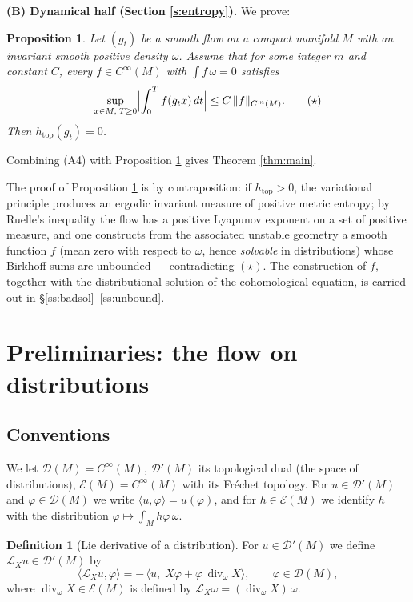 \documentclass[11pt]{amsart}
\theoremstyle{plain}
\newtheorem{proposition}[theorem]{Proposition}
\theoremstyle{definition}
\newtheorem{definition}[theorem]{Definition}
\theoremstyle{remark}
\newcommand{\D}{\mathcal{D}}
\newcommand{\DD}{\mathcal{D}'}
\newcommand{\EE}{\mathcal{E}}
\newcommand{\flow}{g_t}
\newcommand{\Lie}{\mathcal{L}}
\begin{document}
\medskip
\noindent\textbf{(B) Dynamical half (Section \ref{s:entropy}).}  We
prove:

\begin{proposition}\label{p:entropycore}
Let $(\flow)$ be a smooth flow on a compact manifold $M$ with an
invariant smooth positive density $\omega$.  Assume that for some
integer $m$ and constant $C$, every $f\in C^\infty(M)$ with
$\int f\,\omega=0$ satisfies
\[
\sup_{x\in M,\; T\ge 0}\Bigl|\int_0^{T}f(g_t x)\,dt\Bigr|
\le C\,\|f\|_{C^{m}(M)} .
\tag{$\star$}
\]
Then $h_{\mathrm{top}}(\flow)=0$.
\end{proposition}

Combining (A4) with Proposition \ref{p:entropycore} gives
Theorem \ref{thm:main}.

The proof of Proposition \ref{p:entropycore} is by contraposition:
if $h_{\mathrm{top}}>0$, the variational principle produces an
ergodic invariant measure of positive metric entropy; by Ruelle's
inequality the flow has a positive Lyapunov exponent on a set of
positive measure, and one constructs from the associated unstable
geometry a smooth function $f$ (mean zero with respect to $\omega$,
hence \emph{solvable} in distributions) whose Birkhoff sums are
unbounded --- contradicting $(\star)$.  The construction of $f$,
together with the distributional solution of the cohomological
equation, is carried out in \S\ref{ss:badsol}--\ref{ss:unbound}.

\section{Preliminaries: the flow on distributions}\label{s:prelim}

\subsection{Conventions}

We let $\D(M)=C^\infty(M)$, $\DD(M)$ its topological dual (the space
of distributions), $\EE(M)=C^\infty(M)$ with its Fr\'echet topology.
For $u\in \DD(M)$ and $\varphi\in \D(M)$ we write
$\langle u,\varphi\rangle=u(\varphi)$, and for $h\in \EE(M)$ we
identify $h$ with the distribution
$\varphi\mapsto\int_M h\varphi\,\omega$.

\begin{definition}[Lie derivative of a distribution]\label{d:Lie}
For $u\in\DD(M)$ we define $\Lie_X u\in\DD(M)$ by
\begin{equation}\label{eq:defLie}
\langle \Lie_X u,\varphi\rangle
= -\,\bigl\langle u,\;X\varphi+\varphi\,\operatorname{div}_\omega X\bigr\rangle,
\qquad \varphi\in\D(M),
\end{equation}
where $\operatorname{div}_\omega X\in\EE(M)$ is defined by
$\Lie_X\omega=(\operatorname{div}_\omega X)\,\omega$.
\end{definition}
\end{document}
